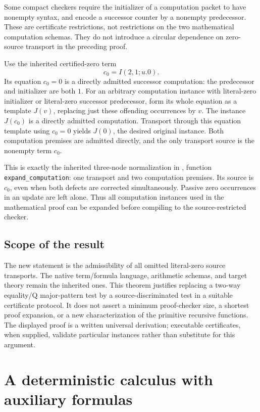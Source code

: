 \documentclass[11pt,letterpaper]{article}
\theoremstyle{definition}
\begin{document}
Some compact checkers require the initializer of a computation packet
to have nonempty syntax, and encode a successor counter by a nonempty
predecessor. These are certificate restrictions, not restrictions
on the two mathematical computation schemas. They do not introduce
a circular dependence on zero-source transport in the preceding proof.

Use the inherited certified-zero term
\[
                         c_0=I(2,1;u.0).
\]
Its equation $c_0=0$ is a directly admitted successor computation:
the predecessor and initializer are both $1$. For an arbitrary
computation instance with literal-zero initializer or literal-zero
successor predecessor, form its whole equation as a template $J(v)$,
replacing just these offending occurrences by $v$. The instance
$J(c_0)$ is a directly admitted computation. Transport through this
equation template using $c_0=0$ yields $J(0)$, the desired original
instance. Both computation premises are admitted directly, and the
only transport source is the nonempty term $c_0$.

This is exactly the inherited three-node normalization in
, function
\texttt{expand\_computation}: one transport and two computation
premises. Its source is $c_0$, even when both defects are corrected
simultaneously. Passive zero occurrences in an update are left alone.
Thus all computation instances used in the mathematical proof can
be expanded before compiling to the source-restricted checker.

\subsection{Scope of the result}

The new statement is the admissibility of all omitted literal-zero
source transports. The native term/formula language, arithmetic
schemas, and target theory remain the inherited ones. This theorem
justifies replacing a two-way equality/Q major-pattern test by a
source-discriminated test in a suitable certificate protocol. It
does not assert a minimum proof-checker size, a shortest proof
expansion, or a new characterization of the primitive recursive
functions. The displayed proof is a written universal derivation;
executable certificates, when supplied, validate particular
instances rather than substitute for this argument.


\section{A deterministic calculus with auxiliary formulas}
\label{sec:composition}
\end{document}
